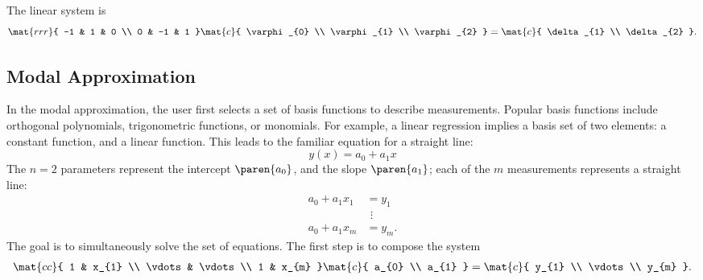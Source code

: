 The linear system is
  \begin{equation}   %
    \mat{rrr}{ 
      -1 & 1 & 0 \\
       0 & -1 & 1 }
    \mat{c}{ \varphi_{0} \\ \varphi_{1} \\ \varphi_{2} }
    =
    \mat{c}{ \delta_{1} \\ \delta_{2} } .
    \label{eq:zonalls}
  \end{equation}

\subsection{\label{ssec:modal approx}Modal Approximation}  %
In the modal approximation, the user first selects a set of basis functions to describe measurements. Popular basis functions include orthogonal polynomials, trigonometric functions, or monomials. For example, a linear regression implies a basis set of two elements: a constant function, and a linear function. This leads to the familiar equation for a straight line:
  \begin{equation*}   %
    y(x) = a_{0} + a_{1} x
  \end{equation*}
The $n=2$ parameters represent the intercept $\paren{a_{0}}$, and the slope $\paren{a_{1}}$; each of the $m$ measurements represents a straight line:
  \begin{equation*}   %
   \begin{split}
     a_{0} + a_{1} x_{1} &= y_{1} \\
       & \ \, \vdots \\
     a_{0} + a_{1} x_{m} &= y_{m} .
   \end{split}
  \end{equation*}
The goal is to simultaneously solve the set of equations. The first step is to compose the system
  \begin{equation}   %
   \begin{split}
     \mat{cc}{ 1 & x_{1} \\ \vdots & \vdots \\ 1 & x_{m} }
     \mat{c}{ a_{0} \\ a_{1} }
     =
     \mat{c}{ y_{1} \\ \vdots \\ y_{m} } .
    \label{eq:modalls}
   \end{split}
  \end{equation}

